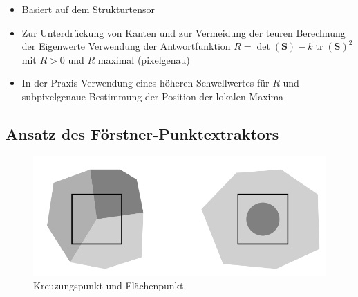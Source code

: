 \documentclass[11pt]{article}
\DeclareMathOperator{\tr}{tr} %
\begin{document}
\begin{itemize}
    \item Basiert auf dem Strukturtensor
    \item Zur Unterdrückung von Kanten und zur Vermeidung der teuren Berechnung der Eigenwerte Verwendung der Antwortfunktion $R = \det {(\boldsymbol{S})} - k \tr{ (\boldsymbol{S}) }^2$ mit $R > 0$ und $R$ maximal (pixelgenau)
    \item In der Praxis Verwendung eines höheren Schwellwertes für $R$ und subpixelgenaue Bestimmung der Position der lokalen Maxima 
\end{itemize}

\subsection{Ansatz des Förstner-Punktextraktors}

\begin{figure}[h!]
    \centering
    \includegraphics[scale=0.3]{images/punktregionen.png}
    \caption{Kreuzungspunkt und Flächenpunkt.}
    \label{fig:punktregionen}
\end{figure}
\end{document}
